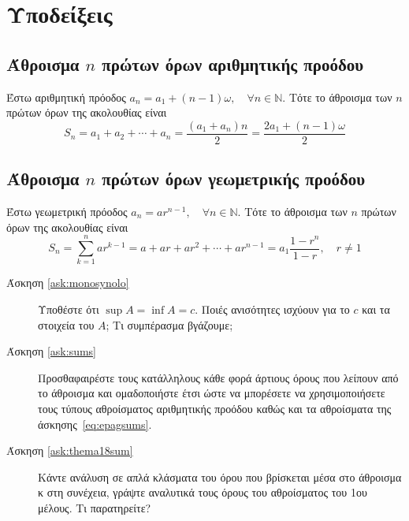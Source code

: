 \documentclass[a4paper,table]{report}
\begin{document}
  \vspace{\baselineskip}

  \section*{Υποδείξεις} 

  \subsection*{Άθροισμα $n$ πρώτων όρων αριθμητικής προόδου}
  Έστω αριθμητική πρόοδος $a_{n} = a_{1} + (n-1)\omega, \quad \forall n \in \mathbb{N}$.
  Τότε το άθροισμα των $n$ πρώτων όρων της ακολουθίας είναι
  \[
    S_{n} = a_{1} + a_{2} + \cdots + a_{n} = \frac{(a_{1} + a_{n})n}{2} =
    \frac{2a_{1}+(n-1)\omega}{2}
  \]
  \subsection*{Άθροισμα $n$ πρώτων όρων γεωμετρικής προόδου}
  Έστω γεωμετρική πρόοδος $ a_{n} = a r^{n-1}, \quad \forall n \in \mathbb{N} $.
  Τότε το άθροισμα των $n$ πρώτων όρων της ακολουθίας είναι
  \[
    S_{n} = \sum_{k=1}^{n} ar^{k-1} = a + ar + ar^{2} + \cdots + ar^{n-1} = 
    a_{1}\frac{1 - r^{n}}{1-r}, \quad r \neq 1 
  \] 

  \begin{description}
    \item [Άσκηση \ref{ask:monosynolo}] Υποθέστε ότι $ \sup A = \inf A = c
      $. Ποιές ανισότητες ισχύουν για το $c$ και τα στοιχεία του $A$; 
      Τι συμπέρασμα βγάζουμε;

    \item [Άσκηση \ref{ask:sums}] Προσθαφαιρέστε τους κατάλληλους κάθε φορά  
      άρτιους όρους που λείπουν από το άθροισμα και ομαδοποιήστε έτσι ώστε να 
      μπορέσετε να χρησιμοποιήσετε τους τύπους αθροίσματος αριθμητικής προόδου 
      καθώς και τα αθροίσματα της άσκησης~\ref{eq:epagsums}.

    \item [Άσκηση \ref{ask:thema18sum}] Κάντε ανάλυση σε απλά κλάσματα 
      του όρου που βρίσκεται μέσα στο άθροισμα κ στη συνέχεια, γράψτε
      αναλυτικά τους όρους του αθροίσματος του 1ου μέλους. Τι παρατηρείτε?
  \end{description}
  
\end{document}
